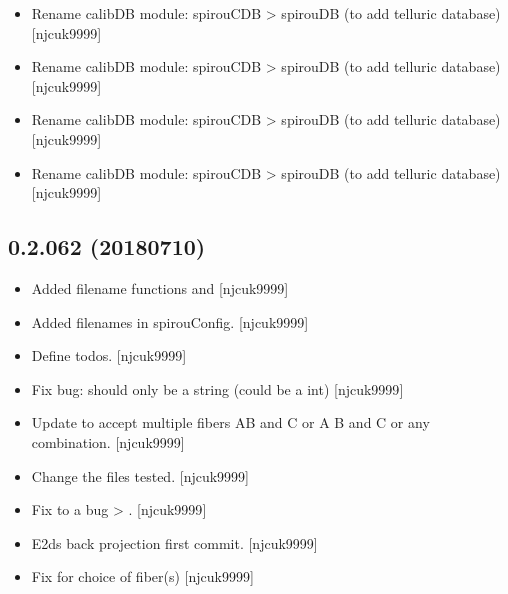 \documentclass[a4paper,10pt,english]{report}
\begin{document}
\begin{itemize}
\item {} 
Rename calibDB module: spirouCDB \textendash{}\textgreater{} spirouDB (to add telluric
database) {[}njcuk9999{]}

\item {} 
Rename calibDB module: spirouCDB \textendash{}\textgreater{} spirouDB (to add telluric
database) {[}njcuk9999{]}

\item {} 
Rename calibDB module: spirouCDB \textendash{}\textgreater{} spirouDB (to add telluric
database) {[}njcuk9999{]}

\item {} 
Rename calibDB module: spirouCDB \textendash{}\textgreater{} spirouDB (to add telluric
database) {[}njcuk9999{]}

\end{itemize}


\subsection{0.2.062 (2018\sphinxhyphen{}07\sphinxhyphen{}10)}
\label{\detokenize{misc/changelog:id417}}\begin{itemize}
\item {} 
Added filename functions  and 
{[}njcuk9999{]}

\item {} 
Added filenames in spirouConfig. {[}njcuk9999{]}

\item {} 
Define todos. {[}njcuk9999{]}

\item {} 
Fix bug:  should only be a string (could be a int)
{[}njcuk9999{]}

\item {} 
Update to accept multiple fibers AB and C or A B and C or any
combination. {[}njcuk9999{]}

\item {} 
Change the files tested. {[}njcuk9999{]}

\item {} 
Fix to a bug  \textendash{}\textgreater{} . {[}njcuk9999{]}

\item {} 
E2ds back projection \sphinxhyphen{} first commit. {[}njcuk9999{]}

\item {} 
Fix for choice of fiber(s) {[}njcuk9999{]}

\end{itemize}
\end{document}
